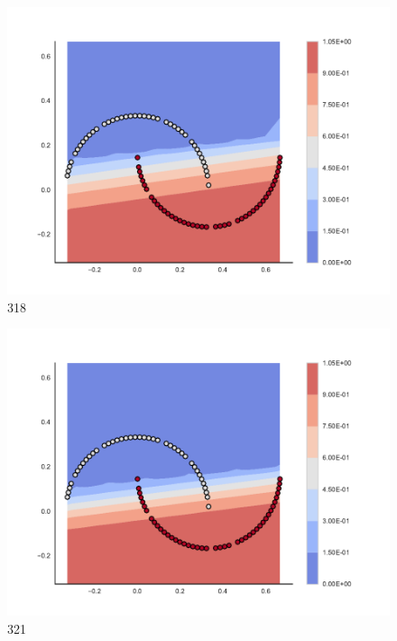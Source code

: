 \begin{subfigure}[b]{0.09\textwidth}
    \includegraphics[clip, trim=2.35cm 1.75cm 4.5cm 0cm,width=\textwidth]{img/convergence/318.pdf}
    \caption{318}
    \label{fig:convergence_318}
\end{subfigure}
%
\begin{subfigure}[b]{0.09\textwidth}
    \includegraphics[clip, trim=2.35cm 1.75cm 4.5cm 0cm,width=\textwidth]{img/convergence/321.pdf}
    \caption{321}
    \label{fig:convergence_321}
\end{subfigure}
%
